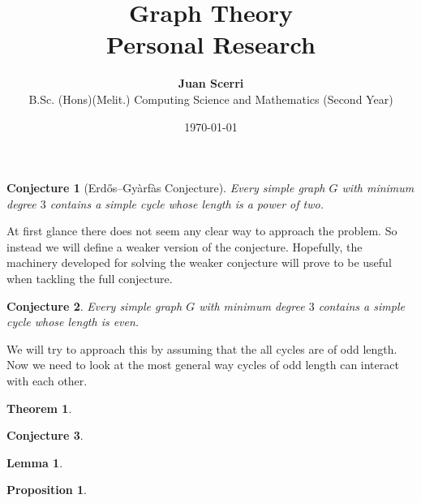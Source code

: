 \documentclass[12pt]{article}
\title{Graph Theory\\
\vspace{0.75em}\textbf{Personal Research}}
\date{\today}
\author {{\textbf{Juan Scerri}}\\
B.Sc. (Hons)(Melit.) Computing Science and Mathematics (Second Year)}
\theoremstyle{plain}
\newtheorem{thm}{Theorem}
\newtheorem{lma}{Lemma}
\newtheorem{prop}{Proposition}
\newtheorem{conj}{Conjecture}
\begin{document}
\maketitle %

\thispagestyle{empty} %

\begin{conj}[Erd\H os–Gy\` arf\` as Conjecture]

Every simple graph $G$ with minimum degree $3$ contains a simple
cycle whose length is a power of two.

\end{conj}

At first glance there does not seem any clear way to approach
the problem. So instead we will define a weaker version of the
conjecture. Hopefully, the machinery developed for solving the
weaker conjecture will prove to be useful when tackling the full
conjecture.

\begin{conj}

Every simple graph $G$ with minimum degree $3$ contains a simple
cycle whose length is even.

\end{conj}

We will try to approach this by assuming that the all cycles are
of odd length. Now we need to look at the most general way
cycles of odd length can interact with each other.




\begin{thm}
\end{thm}

\begin{conj}
\end{conj}

\begin{lma}
\end{lma}

\begin{prop}
\end{prop}

\begin{corollary}
\end{corollary}
\end{document}
